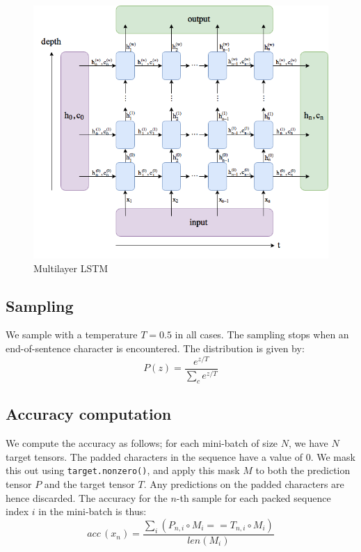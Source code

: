 \documentclass[twocolumn, 9pt]{article}
\begin{document}
\begin{figure}[htbp]
  \centering
  \includegraphics[width=0.95\columnwidth]{lstm.png}
  \caption[Multilayer LSTM]{Multilayer LSTM\footnotemark}
  \label{fig:lstm}
\end{figure}


\subsection*{Sampling}
We sample with a temperature $T=0.5$ in all cases. The sampling stops when an end-of-sentence character
is encountered. The distribution is given by:
\begin{equation*}
  P(z) = \frac{e^{z/T}}{\sum_c e^{z/T}}
\end{equation*}

\subsection*{Accuracy computation}
We compute the accuracy as follows; for each mini-batch of size $N$, we have $N$ target
tensors. The padded characters in the sequence have a value of 0. We mask this out using
\lstinline{target.nonzero()}, and apply this mask $M$ to both the prediction tensor $P$ and the
target tensor $T$. Any predictions on the padded characters are hence discarded. The accuracy
for the $n$-th sample for each packed sequence index $i$ in the mini-batch is thus:
\begin{equation*}
    acc\,(x_n) = \frac{\sum_i(P_{n,i}\circ M_i == T_{n,i}\circ M_i)}{len(M_i)}
\end{equation*}
\end{document}
